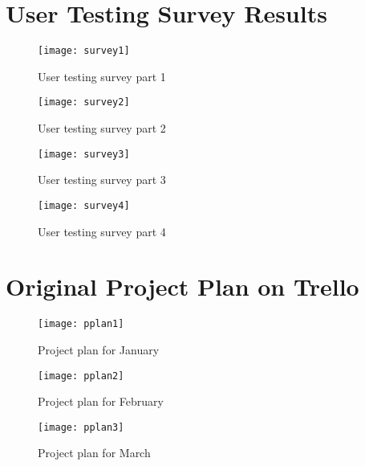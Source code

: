 \chapter{User Testing Survey Results}
\label{appendix:survey}
\begin{figure}[h]
	\centering
	\texttt{[image: survey1]}
	\caption{User testing survey part 1}
	\label{fig:survey1}
\end{figure}
\begin{figure}[h]
	\centering
	\texttt{[image: survey2]}
	\caption{User testing survey part 2}
	\label{fig:survey2}
\end{figure}
\begin{figure}[h]
	\centering
	\texttt{[image: survey3]}
	\caption{User testing survey part 3}
	\label{fig:survey3}
\end{figure}
\begin{figure}[h]
	\centering
	\texttt{[image: survey4]}
	\caption{User testing survey part 4}
	\label{fig:survey4}
\end{figure}

\chapter{Original Project Plan on Trello}
\label{appendix:plan}
\begin{figure}[h]
	\centering
	\texttt{[image: pplan1]}
	\caption{Project plan for January}
	\label{fig:pplan1}
\end{figure}
\begin{figure}[h]
	\centering
	\texttt{[image: pplan2]}
	\caption{Project plan for February}
	\label{fig:pplan2}
\end{figure}
\begin{figure}[h]
	\centering
	\texttt{[image: pplan3]}
	\caption{Project plan for March}
	\label{fig:pplan3}
\end{figure}